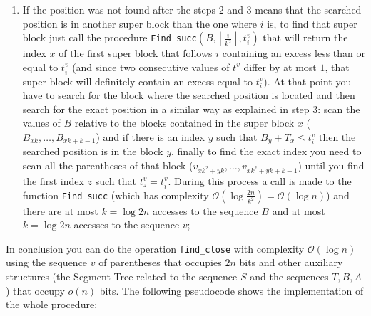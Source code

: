 \documentclass{article}
\begin{document}
\begin{enumerate}
        \item If the position was not found after the steps $2$ and $3$ means that the searched position is in another super block than the one where $i$ is, to find that super block just call the procedure \texttt{Find\_succ}$(B,\left\lfloor{\frac{i}{k^2}}\right\rfloor,t^v_i)$ that will return the index $x$ of the first super block that follows $i$ containing an excess less than or equal to $t^v_i$ (and since two consecutive values of $t^v$ differ by at most $1$, that super block will definitely contain an excess equal to $t^v_i$). At that point you have to search for the block where the searched position is located and then search for the exact position in a similar way as explained in step $3$: scan the values of $B$ relative to the blocks contained in the super block $x$ ($B_{xk},\dots,B_{xk+k-1}$) and if there is an index $y$ such that $B_y+T_x \leq t^v_i$ then the searched position is in the block $y$, finally to find the exact index you need to scan all the parentheses of that block ($v_{xk^2+yk},\dots,v_{xk^2+yk+k-1}$) until you find the first index $z$ such that $t^v_z=t^v_i$. During this process a call is made to the function \texttt{Find\_succ} (which has complexity $\mathcal{O}(\log{\frac{2n}{k^2}})=\mathcal{O}(\log{n})$) and there are at most $k=\log{2n}$ accesses to the sequence $B$ and at most $k=\log{2n}$ accesses to the sequence $v$;
    \end{enumerate}
In conclusion you can do the operation \texttt{find\_close} with complexity $\mathcal{O}(\log{n})$ using the sequence $v$ of parentheses that occupies $2n$ bits and other auxiliary structures (the Segment Tree related to the sequence $S$ and the sequences $T,B,A$) that occupy $o(n)$ bits. The following pseudocode shows the implementation of the whole procedure:
\end{document}
